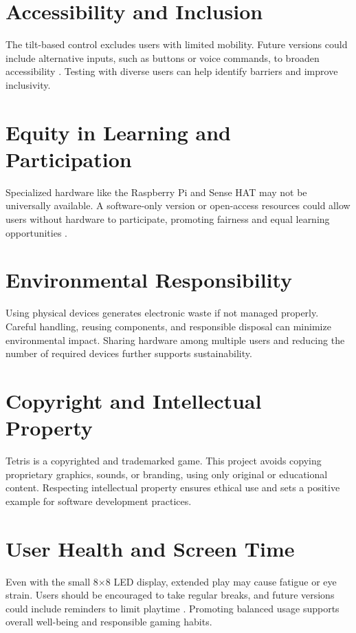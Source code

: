 \documentclass[12pt]{report}
\begin{document}
\section{Accessibility and Inclusion}
The tilt-based control excludes users with limited mobility. Future versions could include alternative inputs, such as buttons or voice commands, to broaden accessibility \cite{Seale2014}. Testing with diverse users can help identify barriers and improve inclusivity.

\section{Equity in Learning and Participation}
Specialized hardware like the Raspberry Pi and Sense HAT may not be universally available. A software-only version or open-access resources could allow users without hardware to participate, promoting fairness and equal learning opportunities \cite{warschauer2004technology}.

\section{Environmental Responsibility}
Using physical devices generates electronic waste if not managed properly. Careful handling, reusing components, and responsible disposal can minimize environmental impact. Sharing hardware among multiple users and reducing the number of required devices further supports sustainability.

\section{Copyright and Intellectual Property}
Tetris is a copyrighted and trademarked game. This project avoids copying proprietary graphics, sounds, or branding, using only original or educational content. Respecting intellectual property ensures ethical use and sets a positive example for software development practices.

\section{User Health and Screen Time}
Even with the small 8$\times$8 LED display, extended play may cause fatigue or eye strain. Users should be encouraged to take regular breaks, and future versions could include reminders to limit playtime \cite{king2013videogame}. Promoting balanced usage supports overall well-being and responsible gaming habits.
\end{document}
